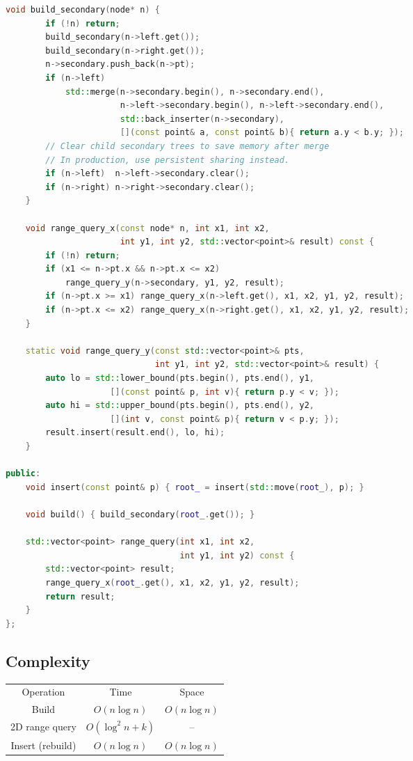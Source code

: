 \begin{lstlisting}[language=C++]
    void build_secondary(node* n) {
        if (!n) return;
        build_secondary(n->left.get());
        build_secondary(n->right.get());
        n->secondary.push_back(n->pt);
        if (n->left)
            std::merge(n->secondary.begin(), n->secondary.end(),
                       n->left->secondary.begin(), n->left->secondary.end(),
                       std::back_inserter(n->secondary),
                       [](const point& a, const point& b){ return a.y < b.y; });
        // Clear child secondary trees to save memory after merge
        // In production, use persistent sharing instead.
        if (n->left)  n->left->secondary.clear();
        if (n->right) n->right->secondary.clear();
    }

    void range_query_x(const node* n, int x1, int x2,
                       int y1, int y2, std::vector<point>& result) const {
        if (!n) return;
        if (x1 <= n->pt.x && n->pt.x <= x2)
            range_query_y(n->secondary, y1, y2, result);
        if (n->pt.x >= x1) range_query_x(n->left.get(), x1, x2, y1, y2, result);
        if (n->pt.x <= x2) range_query_x(n->right.get(), x1, x2, y1, y2, result);
    }

    static void range_query_y(const std::vector<point>& pts,
                              int y1, int y2, std::vector<point>& result) {
        auto lo = std::lower_bound(pts.begin(), pts.end(), y1,
                     [](const point& p, int v){ return p.y < v; });
        auto hi = std::upper_bound(pts.begin(), pts.end(), y2,
                     [](int v, const point& p){ return v < p.y; });
        result.insert(result.end(), lo, hi);
    }

public:
    void insert(const point& p) { root_ = insert(std::move(root_), p); }

    void build() { build_secondary(root_.get()); }

    std::vector<point> range_query(int x1, int x2,
                                   int y1, int y2) const {
        std::vector<point> result;
        range_query_x(root_.get(), x1, x2, y1, y2, result);
        return result;
    }
};
\end{lstlisting}

\subsection{Complexity}

\begin{center}
\begin{tabular}{ccc}
\toprule
Operation & Time & Space \\
Build & $O(n \log n)$ & $O(n \log n)$ \\
2D range query & $O(\log^{2} n + k)$ & -- \\
Insert (rebuild) & $O(n \log n)$ & $O(n \log n)$ \\
\bottomrule
\end{tabular}
\end{center}

